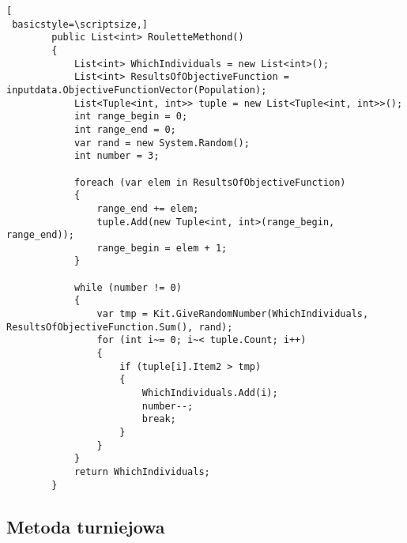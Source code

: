 \begin{lstlisting}[
 basicstyle=\scriptsize,]
        public List<int> RouletteMethond()
        {
            List<int> WhichIndividuals = new List<int>();
            List<int> ResultsOfObjectiveFunction = inputdata.ObjectiveFunctionVector(Population);
            List<Tuple<int, int>> tuple = new List<Tuple<int, int>>();
            int range_begin = 0;
            int range_end = 0;
            var rand = new System.Random();
            int number = 3;

            foreach (var elem in ResultsOfObjectiveFunction)
            {
                range_end += elem;
                tuple.Add(new Tuple<int, int>(range_begin, range_end));
                range_begin = elem + 1;
            }

            while (number != 0)
            {
                var tmp = Kit.GiveRandomNumber(WhichIndividuals, ResultsOfObjectiveFunction.Sum(), rand);
                for (int i~= 0; i~< tuple.Count; i++)
                {
                    if (tuple[i].Item2 > tmp)
                    {
                        WhichIndividuals.Add(i);
                        number--;
                        break;
                    }
                }
            }
            return WhichIndividuals;
        }
\end{lstlisting}

\subsection*{Metoda turniejowa}

